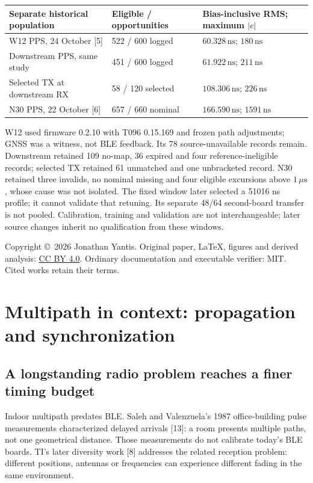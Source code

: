 \documentclass[11pt,letterpaper]{article}
\newcommand{\ns}{\,\mathrm{ns}}\newcommand{\us}{\,\mu\mathrm{s}}\newcommand{\ms}{\,\mathrm{ms}}
\begin{document}
\begin{center}\small
\begin{tabular}{L{.31\linewidth}L{.23\linewidth}L{.37\linewidth}}\toprule
Separate historical population & Eligible / opportunities & Bias-inclusive RMS; maximum $|e|$\\\midrule
W12 PPS, 24 October [5] & 522 / 600 logged & $60.328\ns$; $180\ns$\\
Downstream PPS, same study & 451 / 600 logged & $61.922\ns$; $211\ns$\\
Selected TX at downstream RX & 58 / 120 selected & $108.306\ns$; $226\ns$\\
N30 PPS, 22 October [6] & 657 / 660 nominal & $166.590\ns$; $1591\ns$\\\bottomrule
\end{tabular}
\end{center}\vspace{-5pt}
W12 used firmware 0.2.10 with T096 0.15.169 and frozen path adjustments; GNSS was a witness, not BLE feedback. Its 78 source-unavailable records remain. Downstream retained 109 no-map, 36 expired and four reference-ineligible records; selected TX retained 61 unmatched and one unbracketed record. N30 retained three invalids, no nominal missing and four eligible excursions above $1\us$, whose cause was not isolated. The fixed window later selected a 51016 ns profile; it cannot validate that retuning. Its separate 48/64 second-board transfer is not pooled. Calibration, training and validation are not interchangeable; later source changes inherit no qualification from these windows.

{\footnotesize Copyright \copyright\ 2026 Jonathan Yantis. Original paper, LaTeX, figures and derived analysis: \href{https://creativecommons.org/licenses/by/4.0/}{CC BY 4.0}. Ordinary documentation and executable verifier: MIT. Cited works retain their terms.}
\newpage
\section{Multipath in context: propagation and synchronization}
\subsection{A longstanding radio problem reaches a finer timing budget}
Indoor multipath predates BLE. Saleh and Valenzuela's 1987 office-building pulse measurements characterized delayed arrivals [13]: a room presents multiple paths, not one geometrical distance. Those measurements do not calibrate today's BLE boards. TI's later diversity work [8] addresses the related reception problem: different positions, antennas or frequencies can experience different fading in the same environment.
\end{document}
